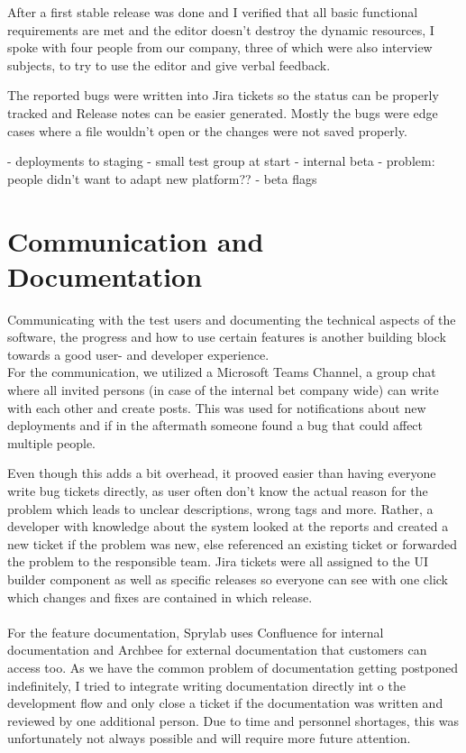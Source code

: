 After a first stable release was done and I verified that all basic functional requirements are met and the editor doesn't destroy the dynamic resources,
I spoke with four people from our company, three of which were also interview subjects, to try to use the editor and give verbal feedback.

The reported bugs were written into Jira tickets so the status can be properly tracked and Release notes can be easier generated.
Mostly the bugs were edge cases where a file wouldn't open or the changes were not saved properly.

- deployments to staging
- small test group at start
- internal beta
 - problem: people didn't want to adapt new platform??
- beta flags

\section{Communication and Documentation}
Communicating with the test users and documenting the technical aspects of the software, the progress and how to use certain features is
another building block towards a good user- and developer experience.
\\
For the communication, we utilized a Microsoft Teams Channel, a group chat where all invited persons (in case of the internal bet company wide) can write with each other and create posts.
This was used for notifications about new deployments and if in the aftermath someone found a bug that could affect multiple people.

Even though this adds a bit overhead, it prooved easier than having everyone write bug tickets directly, as user often don't know the actual reason for the problem which leads to unclear descriptions, wrong tags and more.
Rather, a developer with knowledge about the system looked at the reports and created a new ticket if the problem was new, else referenced an existing ticket or forwarded the problem to the responsible team.
Jira tickets were all assigned to the UI builder component as well as specific releases so everyone can see with one click which changes and fixes are contained in which release.
\\\\
For the feature documentation, Sprylab uses Confluence for internal documentation and Archbee for external documentation that customers can access too.
As we have the common problem of documentation getting postponed indefinitely, I tried to integrate writing documentation directly int o the development flow and only close a ticket if the documentation
was written and reviewed by one additional person. Due to time and personnel shortages, this was unfortunately not always possible and will require more future attention.

